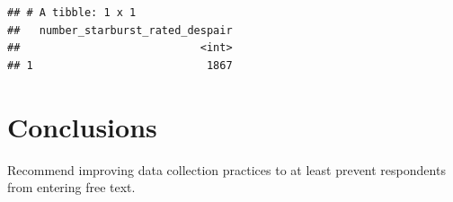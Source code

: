\documentclass[]{article}
\begin{document}
\begin{verbatim}
## # A tibble: 1 x 1
##   number_starburst_rated_despair
##                            <int>
## 1                           1867
\end{verbatim}

\hypertarget{conclusions}{%
\section{Conclusions}\label{conclusions}}

Recommend improving data collection practices to at least prevent
respondents from entering free text.
\end{document}
